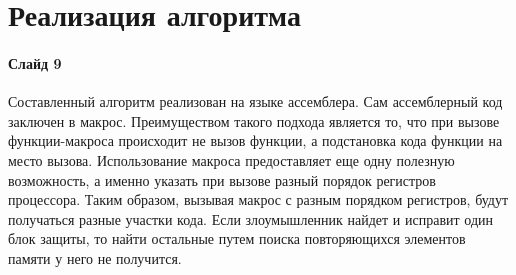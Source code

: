 
\section{Реализация алгоритма}

\paragraph{Слайд 9}\mbox{}\par

Составленный алгоритм реализован на языке ассемблера. Сам ассемблерный код
заключен в макрос. Преимуществом такого подхода является то, что при вызове
функции-макроса происходит не вызов функции, а подстановка кода функции на место
вызова. Использование макроса предоставляет еще одну полезную возможность, а
именно указать при вызове разный порядок регистров процессора. Таким образом,
вызывая макрос с разным порядком регистров, будут получаться разные участки
кода. Если злоумышленник найдет и исправит один блок защиты, то найти остальные
путем поиска повторяющихся элементов памяти у него не получится.



